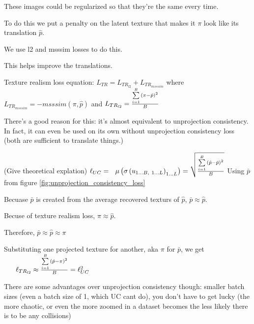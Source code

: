 \documentclass{article}
\begin{document}
These images could be regularized so that they're the same every time.

To do this we put a penalty on the latent texture that makes it $\pi$ look like its translation $\hat{p}$. 

We use l2 and msssim losses to do this.

This helps improve the translations.

Texture realism loss equation:
$L_{TR}=L_{TR_{l2}}+L_{TR_{msssim}}$
where 
$L_{TR_{msssim}} = -msssim(\pi,\hat{p})$ and
$L_{TR_{l2}} = \frac{
	\sum\limits_{i=1}^B {
	   \left( \pi-\hat{p}  \right)^2
		} 
   }
   {B}$

There's a good reason for this: it's almost equivalent to unprojection consistency.
In fact, it can even be used on its own without unprojection consistency loss (both are sufficient to translate things.)

(Give theoretical explation)
$
\ell_{UC} = 
\
\
\mu\left(\sigma\left(u_{1\dots B,\ 1\dots L}\right)_{1 \dots L}\right) = 
\sqrt{
\frac{
	 \sum\limits_{i=1}^B {
		\left( \hat{p}-\bar{p}  \right)^2
		 } 
	}
	{B}
}
$
Using $\bar{p}$ from figure \ref{fig:unprojection_consistency_loss}

Becuase $\bar{p}$ is created from the average recovered texturs of $\hat{p}$, $\bar{p} \approx \hat{p}$.

Becuse of texture realism loss, $\pi \approx \hat{p}$.

Therefore, $\bar{p} \approx \hat{p} \approx \pi$



Substituting one projected texture for another, aka $\pi$ for $\bar{p}$, we get 
$ \
\
\
\
\ \ell_{TR_{l2}}
\approx
\frac{\sum\limits_{i=1}^B {
	\left( \hat{p}-\pi  \right)^2
	 }}{B} = \ell_{UC}^2
$



There are some advantages over unprojection consistency though: 
smaller batch sizes (even a batch size of 1, which UC cant do),
you don't have to get lucky (the more chaotic, or even the more zoomed in a dataset becomes the less likely there is to be any collisions)
\end{document}
